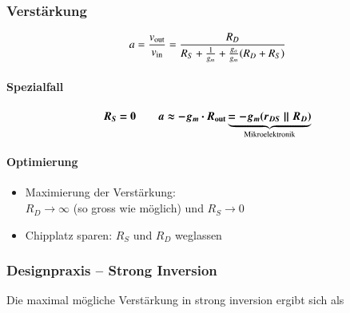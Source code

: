 \begin{minipage}[t]{0.58\columnwidth}
    \subsubsection{Verstärkung}

    \vspace{-0.2cm}
    \[
        a = \frac{v_{\rm out}}{v_{\rm in}} = \frac{R_D}{R_S + \frac{1}{g_m} + \frac{g_o}{g_m}(R_D + R_S)} 
    \]


    \paragraph{Spezialfall}

    \vspace{-0.5cm}

    \[
        \boldsymbol{ R_S = 0 \qquad  a \approx - g_m \cdot R_{\rm out} \underbrace{= - g_m (r_{DS} \parallel R_D) }_{\text{Mikroelektronik}} }
    \]
    


    \vspace{-0.2cm}

    \paragraph{Optimierung}

    \begin{itemize}
        \item Maximierung der Verstärkung: \\
            $R_D \to \infty$ (so gross wie möglich) und $R_S \to 0$
        \item Chipplatz sparen: $R_S$ und $R_D$ weglassen
    \end{itemize}
\end{minipage}


\subsubsection{Designpraxis -- Strong Inversion}

Die \textbf{} maximal mögliche Verstärkung in strong inversion ergibt sich als

\vspace{-0.2cm}

